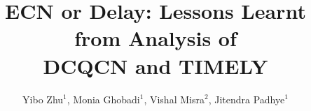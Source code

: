 \documentclass{sig-alternate-10pt}
\begin{document}
\setlength{\textfloatsep}{0.5em}

\title{ECN or Delay: Lessons Learnt from Analysis of\\DCQCN and TIMELY}

\author{Yibo Zhu$^1$, Monia Ghobadi$^1$, Vishal Misra$^2$, Jitendra Padhye$^1$\\
\\
}
\maketitle


%




%



\clearpage



%
\end{document}
